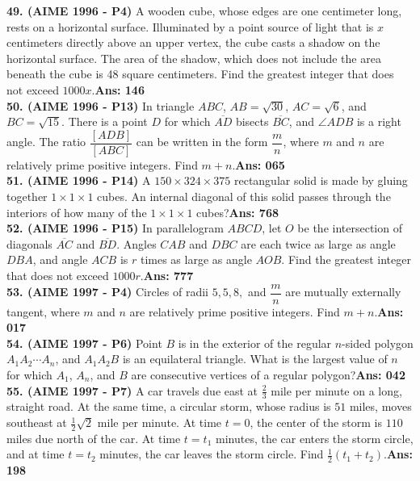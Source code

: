 \documentclass[letterpaper,10pt,addpoints]{exam}
\begin{document}
\textbf{49. (AIME 1996 - P4) }A wooden cube, whose edges are one centimeter long, rests on a horizontal surface. Illuminated by a point source of light that is $x$ centimeters directly above an upper vertex, the cube casts a shadow on the horizontal surface. The area of the shadow, which does not include the area beneath the cube is 48 square centimeters. Find the greatest integer that does not exceed $1000x$.\quad\textbf{Ans: 146}\\

\textbf{50. (AIME 1996 - P13) }In triangle $ABC$, $AB=\sqrt{30}$, $AC=\sqrt{6}$, and $BC=\sqrt{15}$. There is a point $D$ for which $\overline{AD}$ bisects $\overline{BC}$, and $\angle ADB$ is a right angle. The ratio $\dfrac{[ADB]}{[ABC]}$ can be written in the form $\dfrac{m}{n}$, where $m$ and $n$ are relatively prime positive integers. Find $m+n$.\quad\textbf{Ans: 065}\\

\textbf{51. (AIME 1996 - P14) }A $150\times 324\times 375$ rectangular solid is made by gluing together $1\times 1\times 1$ cubes. An internal diagonal of this solid passes through the interiors of how many of the $1\times 1\times 1$ cubes?\quad\textbf{Ans: 768}\\

\textbf{52. (AIME 1996 - P15) }In parallelogram $ABCD$, let $O$ be the intersection of diagonals $\overline{AC}$ and $\overline{BD}$. Angles $CAB$ and $DBC$ are each twice as large as angle $DBA$, and angle $ACB$ is $r$ times as large as angle $AOB$. Find the greatest integer that does not exceed $1000r$.\quad\textbf{Ans: 777}\\

\textbf{53. (AIME 1997 - P4) }Circles of radii $5, 5, 8,$ and $\dfrac mn$ are mutually externally tangent, where $m$ and $n$ are relatively prime positive integers. Find $m + n.$\quad\textbf{Ans: 017}\\

\textbf{54. (AIME 1997 - P6) }Point $B$ is in the exterior of the regular $n$-sided polygon $A_1A_2\cdots A_n$, and $A_1A_2B$ is an equilateral triangle. What is the largest value of $n$ for which $A_1$, $A_n$, and $B$ are consecutive vertices of a regular polygon?\quad\textbf{Ans: 042}\\

\textbf{55. (AIME 1997 - P7) }A car travels due east at $\frac 23$ mile per minute on a long, straight road. At the same time, a circular storm, whose radius is $51$ miles, moves southeast at $\frac 12\sqrt{2}$ mile per minute. At time $t=0$, the center of the storm is $110$ miles due north of the car. At time $t=t_1$ minutes, the car enters the storm circle, and at time $t=t_2$ minutes, the car leaves the storm circle. Find $\frac 12(t_1+t_2)$.\quad\textbf{Ans: 198}\\
\end{document}
